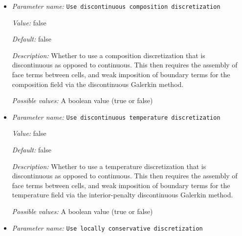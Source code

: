 \begin{itemize}
{\it Value:} 2


{\it Default:} 2


{\it Description:} The polynomial degree to use for the temperature variable. As an example, a value of 2 for this parameter will yield either the element $Q_2$ or $DGQ_2$ for the temperature field, depending on whether we use a continuous or discontinuous field. Units: None.


{\it Possible values:} An integer $n$ such that $1\leq n \leq 2147483647$
\item {\it Parameter name:} {\tt Use discontinuous composition discretization}
\label{parameters:Discretization/Use discontinuous composition discretization}
\label{parameters:Discretization/Use_20discontinuous_20composition_20discretization}


{\it Value:} false


{\it Default:} false


{\it Description:} Whether to use a composition discretization that is discontinuous as opposed to continuous. This then requires the assembly of face terms between cells, and weak imposition of boundary terms for the composition field via the discontinuous Galerkin method.


{\it Possible values:} A boolean value (true or false)
\item {\it Parameter name:} {\tt Use discontinuous temperature discretization}
\label{parameters:Discretization/Use discontinuous temperature discretization}
\label{parameters:Discretization/Use_20discontinuous_20temperature_20discretization}


{\it Value:} false


{\it Default:} false


{\it Description:} Whether to use a temperature discretization that is discontinuous as opposed to continuous. This then requires the assembly of face terms between cells, and weak imposition of boundary terms for the temperature field via the interior-penalty discontinuous Galerkin method.


{\it Possible values:} A boolean value (true or false)
\item {\it Parameter name:} {\tt Use locally conservative discretization}
\label{parameters:Discretization/Use locally conservative discretization}
\label{parameters:Discretization/Use_20locally_20conservative_20discretization}



\end{itemize}
